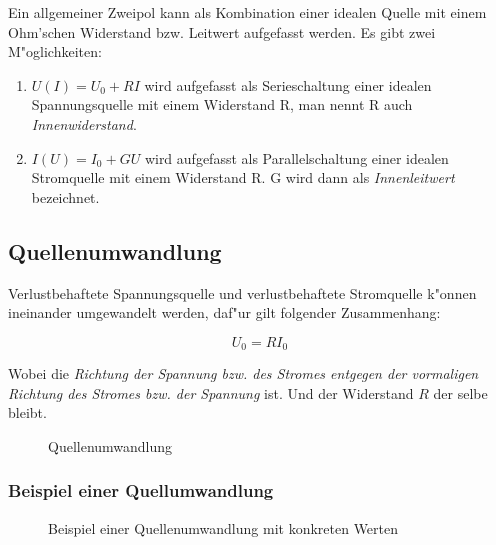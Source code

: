 \documentclass[german, 10pt, a4paper, headsepline]{scrreprt}
\theoremstyle{remark}
\begin{document}

Ein allgemeiner Zweipol kann als Kombination einer idealen Quelle mit einem Ohm'schen Widerstand bzw. Leitwert aufgefasst werden. Es gibt zwei M"oglichkeiten:
\begin{enumerate}
 \item $U(I)=U_0+RI$ wird aufgefasst als Serieschaltung einer idealen Spannungsquelle mit einem Widerstand R, man nennt R auch \textit{Innenwiderstand}.
 \item $I(U)=I_0+GU$ wird aufgefasst als Parallelschaltung einer idealen Stromquelle mit einem Widerstand R. G wird dann als \textit{Innenleitwert}  bezeichnet.
\end{enumerate}

\subsection{Quellenumwandlung}

\label{quellenumwandlung_text}

Verlustbehaftete Spannungsquelle und verlustbehaftete Stromquelle k"onnen ineinander umgewandelt werden, daf"ur gilt folgender Zusammenhang:

\begin{displaymath}
	U_0=RI_0
\end{displaymath}

Wobei die \textit{Richtung der Spannung bzw. des Stromes entgegen der vormaligen Richtung des Stromes bzw. der Spannung} ist. Und der Widerstand $R$ der selbe bleibt.

\begin{figure}[hbt]
 
 \centerline{\box\graph}
 \caption{Quellenumwandlung}
 \label{quellenumwandlung}
\end{figure}

\subsubsection{Beispiel einer Quellumwandlung}

\begin{figure}[hbt]
 
 \centerline{\box\graph}
 \caption{Beispiel einer Quellenumwandlung mit konkreten Werten}
\end{figure}
% 
\end{document}
